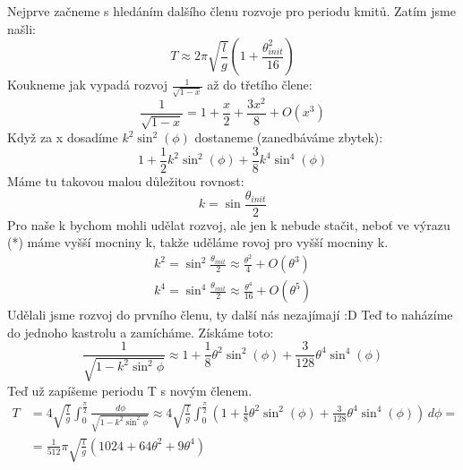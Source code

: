 \documentclass{article}
\begin{document}
Nejprve začneme s hledáním dalšího členu rozvoje pro periodu kmitů.
Zatím jsme našli:
\begin{equation*}
T \approx 2\pi \sqrt{\frac{l}{g}}\left(1+\frac{\theta_{init}^2}{16}\right)
\end{equation*}
Koukneme jak vypadá rozvoj $\frac{1}{\sqrt{1-x}}$ až do třetího člene:
\begin{equation*}
\frac{1}{\sqrt{1-x}} = 1+\frac{x}{2}+\frac{3 x^2}{8}+O\left(x^3\right)
\end{equation*}
Když za x dosadíme $k^2 \sin ^2(\phi )$ dostaneme (zanedbáváme zbytek):
\begin{equation}
1 + \frac{1}{2}k^2\sin^2(\phi)+\frac{3}{8}k^4\sin^4(\phi) \tag{*}
\end{equation}
Máme tu takovou malou důležitou rovnost:
\begin{equation*}
k = \sin\frac{\theta_{init}}{2}
\end{equation*}
Pro naše k bychom mohli udělat rozvoj, ale jen k nebude stačit, neboť ve výrazu (*) máme vyšší mocniny k, takže uděláme rovoj pro vyšší mocniny k.
\begin{align*}
k^2 = \sin^2\frac{\theta_{init}}{2} \approx \frac{\theta ^2}{4}+O\left(\theta ^3\right)\\
k^4 =  \sin^4\frac{\theta_{init}}{2} \approx \frac{\theta ^4}{16}+O\left(\theta ^5\right)
\end{align*}
Udělali jsme rozvoj do prvního členu, ty další nás nezajímají :D
Teď to naházíme do jednoho kastrolu a zamícháme. Získáme toto:
\begin{equation*}
\frac{1}{\sqrt{1-k^2\sin^2\phi}} \approx 1+\frac{1}{8} \theta ^2 \sin ^2(\phi )+\frac{3}{128} \theta ^4 \sin ^4(\phi )
\end{equation*}
Teď už zapíšeme periodu T s novým členem.
\begin{align*}
T &= 4\sqrt{\frac{l}{g}}\int_{0}^{\frac{\pi}{2}}\frac{\,d\phi}{\sqrt{1-k^2\sin^2\phi}}\approx 4\sqrt{\frac{l}{g}}\int_{0}^{\frac{\pi}{2}}\left(1+\frac{1}{8} \theta ^2 \sin ^2(\phi )+\frac{3}{128} \theta ^4 \sin ^4(\phi )\right)\,d\phi= \\
&= \frac{1}{512} \pi  \sqrt{\frac{l}{g}} \left(1024+64 \theta ^2+9 \theta ^4\right)
\end{align*}
\end{document}

